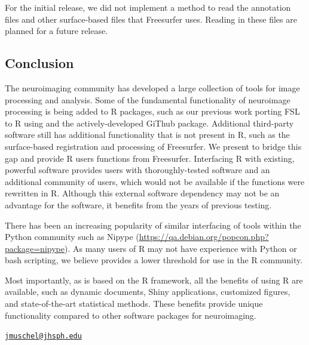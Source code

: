 For the initial release, we did not implement a method to read the
annotation files and other surface-based files that Freesurfer uses.
Reading in these files are planned for a future release.

\subsection{Conclusion}\label{conclusion}

The neuroimaging community has developed a large collection of tools for
image processing and analysis. Some of the fundamental functionality of
neuroimage processing is being added to R packages, such as our previous
work porting FSL to R using  and the actively-developed GiThub
 package. Additional third-party software still has
additional functionality that is not present in R, such as the
surface-based registration and processing of Freesurfer. We present
 to bridge this gap and provide R users functions from
Freesurfer. Interfacing R with existing, powerful software provides
users with thoroughly-tested software and an additional community of
users, which would not be available if the functions were rewritten in
R. Although this external software dependency may not be an advantage
for the software, it benefits from the years of previous testing.

There has been an increasing popularity of similar interfacing of tools
within the Python community such as Nipype
\citep{gorgolewski_nipype:_2011}
(\url{https://qa.debian.org/popcon.php?package=nipype}). As many users
of R may not have experience with Python or bash scripting, we believe
 provides a lower threshold for use in the R community.

Most importantly, as  is based on the R framework, all
the benefits of using R are available, such as dynamic documents, Shiny
applications, customized figures, and state-of-the-art statistical
methods. These benefits provide unique functionality compared to other
software packages for neuroimaging.



\address{%
John Muschelli\\
Johns Hopkins Bloomberg School of Public Health\\
Department of Biostatistics\\ 615 N Wolfe St, Baltimore, MD, 21205\\
}
\href{mailto:jmuschel@jhsph.edu}{\nolinkurl{jmuschel@jhsph.edu}}

